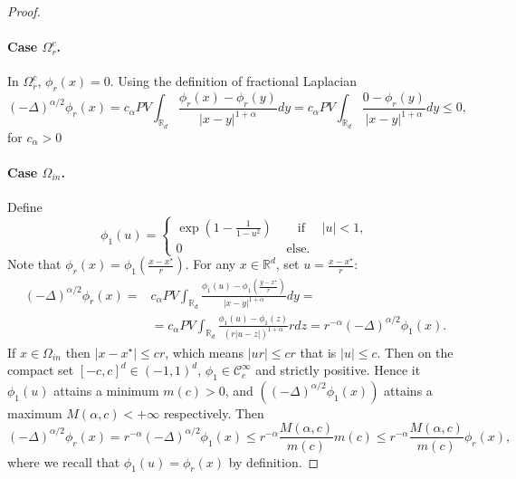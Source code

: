 \documentclass[10pt,a4paper]{amsart}
\def\RR{\mathbb R}
\begin{document}
\begin{proof}
	\paragraph{Case $\Omega_r^c$.} In $\Omega_r^c$, $\phi_r(x)=0$. Using the definition of fractional Laplacian 
	\begin{equation*}
		(-\Delta)^{\alpha/2} \phi_r(x) = c_\alpha PV \int_{\RR_d} \frac{\phi_r(x)-\phi_r(y)}{\vert x-y\vert^{1+\alpha}} dy = c_\alpha PV \int_{\RR_d} \frac{0-\phi_r(y)}{\vert x-y\vert^{1+\alpha}} dy \leq 0,
	\end{equation*}
	for $c_\alpha>0$
	\paragraph{Case $\Omega_{in}$.} 
	Define 
	\begin{equation}\label{eq:phi_1} 
		\phi_1(u) =   \begin{cases}
			\exp \left( 1- \frac{1}{1 - u^2} \right)  \qquad \text{if } \quad \vert u \vert < 1,\\
			0  \qquad  \qquad \qquad \qquad  ~ \text{else}. 
		\end{cases}  
	\end{equation}
	Note that $\phi_r(x) = \phi_1\left( \frac{x-x^\star}{r}\right)$. For any $x\in \RR^d$, set $u=\frac{x-x^\star}{r} $:
	\begin{equation}\label{eq:relation_phi1_phi_r} 
		\begin{split}
			(-\Delta)^{\alpha/2} \phi_r(x) =&   c_\alpha PV \int_{\RR_d} \frac{\phi_1(u)-\phi_1(\frac{y-x^\star}{r})}{\vert x-y\vert^{1+\alpha}} dy = \\ & = c_\alpha PV \int_{\RR_d} \frac{\phi_1(u)-\phi_1(z)}{(r\vert u-z\vert)^{1+\alpha}} r dz  = r^{-\alpha}  (-\Delta)^{\alpha/2} \phi_1(x).
		\end{split}
	\end{equation}
	If $x\in \Omega_{in}$ then $\vert x-x^\star\vert\leq cr$, which means $\vert ur\vert \leq cr$ that is $\vert u \vert \leq c$. Then on the compact set $[-c,c]^d \in (-1,1)^d$, $\phi_1\in \mathcal{C}_c^\infty$ and strictly positive. Hence it $\phi_1(u)$ attains a minimum $m(c)>0$, and $((-\Delta)^{\alpha/2}\phi_1(x))$  attains a maximum $M(\alpha,c)<+\infty$  respectively. 
	Then 
	\begin{equation}
		(-\Delta)^{\alpha/2} \phi_r(x) =  r^{-\alpha}  (-\Delta)^{\alpha/2} \phi_1(x) \leq  r^{-\alpha} \frac{M(\alpha,c)}{m(c)} m(c) \leq   r^{-\alpha} \frac{M(\alpha,c)}{m(c)}\phi_r(x), 
	\end{equation}
	where we recall that $\phi_1(u) = \phi_r(x)$ by definition.  

\end{proof}
\end{document}
